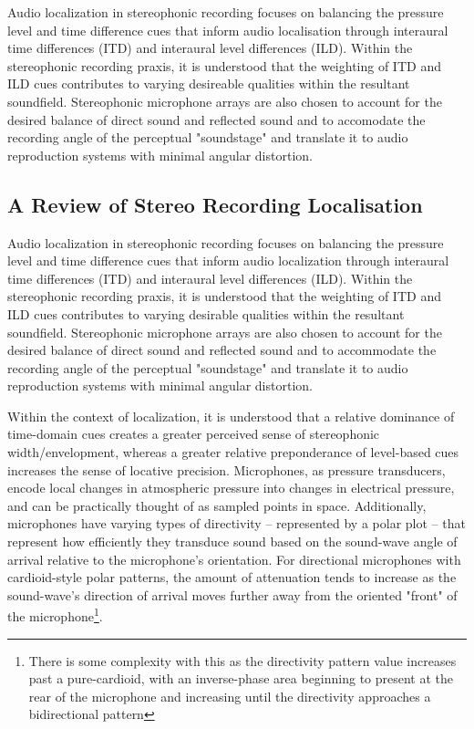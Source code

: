 Audio localization in stereophonic recording focuses on balancing the pressure level and time difference cues that inform audio localisation through interaural time differences (ITD) and interaural level differences (ILD). Within the stereophonic recording praxis, it is understood that the weighting of ITD and ILD cues contributes to varying desireable qualities within the resultant soundfield. Stereophonic microphone arrays are also chosen to account for the desired balance of direct sound and reflected sound and to accomodate the recording angle of the perceptual "soundstage" and translate it to audio reproduction systems with minimal angular distortion.

\subsection{A Review of Stereo Recording Localisation}

Audio localization in stereophonic recording focuses on balancing the pressure level and time difference cues that inform audio localization through interaural time differences (ITD) and interaural level differences (ILD). Within the stereophonic recording praxis, it is understood that the weighting of ITD and ILD cues contributes to varying desirable qualities within the resultant soundfield. Stereophonic microphone arrays are also chosen to account for the desired balance of direct sound and reflected sound and to accommodate the recording angle of the perceptual "soundstage" and translate it to audio reproduction systems with minimal angular distortion.

Within the context of localization, it is understood that a relative dominance of time-domain cues creates a greater perceived sense of stereophonic width/envelopment, whereas a greater relative preponderance of level-based cues increases the sense of locative precision. Microphones, as pressure transducers, encode local changes in atmospheric pressure into changes in electrical pressure, and can be practically thought of as sampled points in space. Additionally, microphones have varying types of directivity -- represented by a polar plot -- that represent how efficiently they transduce sound based on the sound-wave angle of arrival relative to the microphone's orientation. For directional microphones with cardioid-style polar patterns, the amount of attenuation tends to increase as the sound-wave's direction of arrival moves further away from the oriented "front" of the microphone\footnote{There is some complexity with this as the directivity pattern value increases past a pure-cardioid, with an inverse-phase area beginning to present at the rear of the microphone and increasing until the directivity approaches a bidirectional pattern}.


